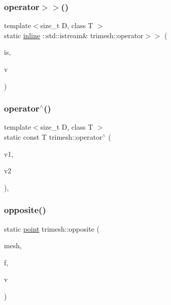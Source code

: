 \mbox{\label{namespacetrimesh_ade316652ff80860499b6f566d597bc20}} 
\subsubsection{\texorpdfstring{operator$>$$>$()}{operator>>()}\hspace{0.1cm}{\footnotesize\ttfamily [2/2]}}
{\footnotesize\ttfamily template$<$size\+\_\+t D, class T $>$ \\
static \hyperlink{XForm_8h_a00d24c7231be28dbaf71f5408f30e44c}{inline} \+::std\+::istream\& trimesh\+::operator$>$$>$ (\begin{DoxyParamCaption}\item[{\+::std\+::istream \&}]{is,  }\item[{\hyperlink{classtrimesh_1_1Vec}{Vec}$<$ D, T $>$ \&}]{v }\end{DoxyParamCaption})\hspace{0.3cm}{\ttfamily [static]}}

\mbox{\label{namespacetrimesh_aa416d67511c8d651da54c871fc7905ec}} 
\subsubsection{\texorpdfstring{operator$^\wedge$()}{operator^()}}
{\footnotesize\ttfamily template$<$size\+\_\+t D, class T $>$ \\
static const T trimesh\+::operator$^\wedge$ (\begin{DoxyParamCaption}\item[{const \hyperlink{classtrimesh_1_1Vec}{Vec}$<$ D, T $>$ \&}]{v1,  }\item[{const \hyperlink{classtrimesh_1_1Vec}{Vec}$<$ D, T $>$ \&}]{v2 }\end{DoxyParamCaption})\hspace{0.3cm}{\ttfamily [inline]}, {\ttfamily [static]}}

\mbox{\label{namespacetrimesh_a0b6c5f4d4341d1bfb328eaa00fcbf3a6}} 
\subsubsection{\texorpdfstring{opposite()}{opposite()}}
{\footnotesize\ttfamily static \hyperlink{namespacetrimesh_a325b99fd6454b22fa4c4bc3223271b2c}{point} trimesh\+::opposite (\begin{DoxyParamCaption}\item[{\hyperlink{classtrimesh_1_1TriMesh}{Tri\+Mesh} $\ast$}]{mesh,  }\item[{int}]{f,  }\item[{int}]{v }\end{DoxyParamCaption})\hspace{0.3cm}{\ttfamily [static]}}



